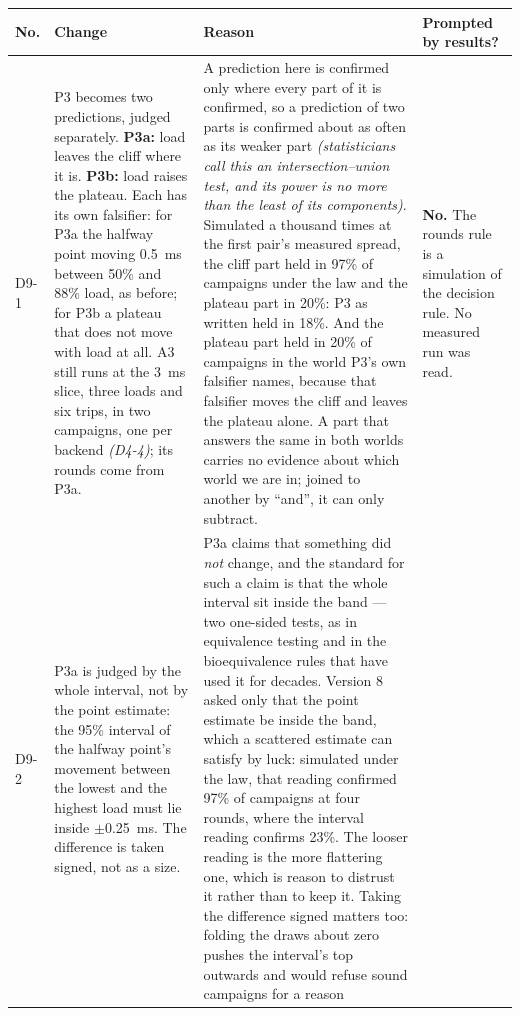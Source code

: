\documentclass[11pt]{article}
\newcommand{\gl}[1]{{\color{soft}\itshape\small (#1)}}
\begin{document}
{\small
\begin{longtable}{@{}p{1.0cm} >{\raggedright\arraybackslash}p{6.2cm} >{\raggedright\arraybackslash}p{6.0cm} >{\raggedright\arraybackslash}p{2.2cm}@{}}
\toprule
\textbf{No.} & \textbf{Change} & \textbf{Reason} & \textbf{Prompted by results?} \\
\midrule
\endhead
D9-1 & P3 becomes two predictions, judged separately. \textbf{P3a:} load leaves the cliff where it
is. \textbf{P3b:} load raises the plateau. Each has its own falsifier: for P3a the halfway point
moving 0.5~ms between 50\% and 88\% load, as before; for P3b a plateau that does not move with
load at all. A3 still runs at the 3~ms slice, three loads and six trips, in two campaigns, one per
backend \gl{D4-4}; its rounds come from P3a. & A prediction here is confirmed only where every part
of it is confirmed, so a prediction of two parts is confirmed about as often as its weaker part
\gl{statisticians call this an intersection--union test, and its power is no more than the least of
its components}. Simulated a thousand times at the first pair's measured spread, the cliff part
held in 97\% of campaigns under the law and the plateau part in 20\%: P3 as written held in 18\%.
And the plateau part held in 20\% of campaigns in the world P3's own falsifier names, because that
falsifier moves the cliff and leaves the plateau alone. A part that answers the same in both worlds
carries no evidence about which world we are in; joined to another by ``and'', it can only
subtract. & \textbf{No.} The rounds rule is a simulation of the decision rule. No measured run was
read. \\
D9-2 & P3a is judged by the whole interval, not by the point estimate: the 95\% interval of the
halfway point's movement between the lowest and the highest load must lie inside $\pm$0.25~ms.
The difference is taken signed, not as a size. & P3a claims that something did \emph{not} change,
and the standard for such a claim is that the whole interval sit inside the band --- two one-sided
tests, as in equivalence testing and in the bioequivalence rules that have used it for decades.
Version 8 asked only that the point estimate be inside the band, which a scattered estimate can
satisfy by luck: simulated under the law, that reading confirmed 97\% of campaigns at four rounds,
where the interval reading confirms 23\%. The looser reading is the more flattering one, which is
reason to distrust it rather than to keep it. Taking the difference signed matters too: folding the
draws about zero pushes the interval's top outwards and would refuse sound campaigns for a reason

\end{longtable}}
\end{document}

